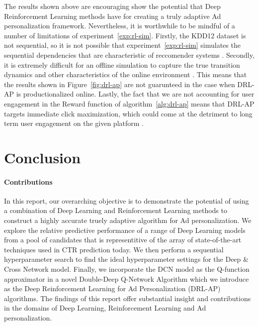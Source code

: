 \documentclass{mldsmsc}
\begin{document}
The results shown above are encouraging show the potential that Deep Reinforcement Learning
methods have for creating a truly adaptive Ad personalization framework. Nevertheless, it is worthwhile to be mindful of a number of limitations
of experiment~\ref{exp:rl-sim}. Firstly, the KDD12 dataset is not sequential, so it is not possible
that experiment~\ref{exp:rl-sim} simulates the sequential dependencies that are characteristic of
reccomender systems \citep{RefWorks:zheng2018drn:}. Secondly, it is extremely difficult for an offline
simulation to capture the true transition dynamics and other characteristics of the online environment
\citep{pike-burke2024LearnigAgents,RefWorks:wang2024deep,RefWorks:zheng2018drn:}. This means that
the results shown in Figure~\ref{fig:drl-ap} are not guarunteed in the case when DRL-AP is productionalized
online. Lastly, the fact that we are not accounting for user engagement in the Reward function of
algorithm~\ref{alg:drl-ap} means that DRL-AP targets immediate click maximization, which could come
at the detriment to long term user engagement on the given platform \cite{RefWorks:zheng2018drn:}.

\chapter{Conclusion}
\label{chap:conclusion}

\subsubsection{Contributions}

In this report, our overarching objective is to demonstrate the potential of using a combination of 
Deep Learning and Reinforcement Learning methods to construct a highly accurate truely
adaptive algorithm for Ad personalization. We explore the relative predictive performance
of a range of Deep Learning models from a pool of candidates that is representitive of the
array of state-of-the-art techniques used in CTR prediction today. We then perform a
sequential hyperparameter search to find the ideal hyperparameter settings for the Deep \& Cross
Network model. Finally, we incorporate the DCN model as the Q-function approximator in
a novel Double-Deep Q-Network Algorithm which we introduce as the Deep Reinforcement Learning
for Ad Personalization (DRL-AP) algorithms. The findings of this report offer substantial insight
and contributions in the domains of Deep Learning, Reinforcement Learning and Ad personalization.
\end{document}
